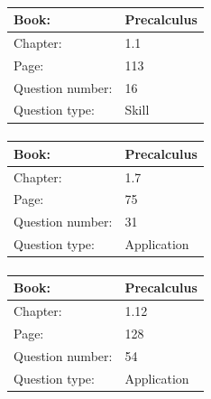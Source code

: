 \documentclass{article}
\begin{document}
            \paragraph{}
            \begin{tabularx}{1\textwidth}{
                    p{}
                    p{}
                }
                \toprule
                Book: & Precalculus
                \\
                \midrule
                Chapter: & 1.1
                \\
                \midrule
                Page: & 113
                \\
                \midrule
                Question number: & 16
                \\
                \midrule
                Question type: & Skill
                \\
                \bottomrule
            \end{tabularx}
            
            \paragraph{}
            \begin{tabularx}{1\textwidth}{
                    p{}
                    p{}
                }
                \toprule
                Book: & Precalculus
                \\
                \midrule
                Chapter: & 1.7
                \\
                \midrule
                Page: & 75
                \\
                \midrule
                Question number: & 31
                \\
                \midrule
                Question type: & Application
                \\
                \bottomrule
            \end{tabularx}
            
            \paragraph{}
            \begin{tabularx}{1\textwidth}{
                    p{}
                    p{}
                }
                \toprule
                Book: & Precalculus
                \\
                \midrule
                Chapter: & 1.12
                \\
                \midrule
                Page: & 128
                \\
                \midrule
                Question number: & 54
                \\
                \midrule
                Question type: & Application
                \\
                \bottomrule
            \end{tabularx}
            
\end{document}
